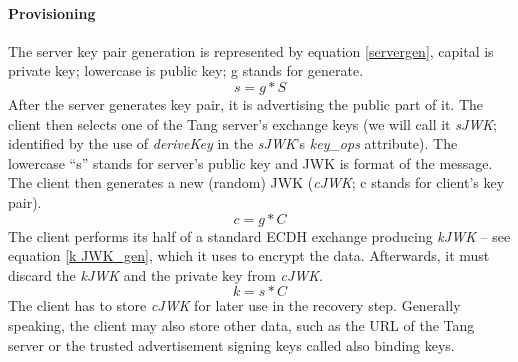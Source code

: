 \paragraph{Provisioning}
The server key pair generation is represented by equation \ref{servergen}, capital is private key; lowercase is public key; g stands for generate.
\begin{equation}\label{servergen}
    s = g * S
\end{equation}
After the server generates key pair, it is advertising the public part of it.
The client then selects one of the Tang server's exchange keys (we will call it {\it sJWK}; identified by the use of {\it deriveKey} in the {\it sJWK}'s {\it key\_ops} attribute).
The lowercase “s” stands for server's public key and JWK is format of the message.
The client then generates a new (random) JWK ({\it cJWK}; c stands for client's key pair).
\begin{equation}\label{clientgen}
    c = g * C
\end{equation}
The client performs its half of a standard ECDH exchange producing {\it kJWK} -- see equation \ref{k    JWK_gen}, which it uses to encrypt the data.
Afterwards, it must discard the {\it kJWK} and the private key from {\it cJWK}.
\begin{equation}\label{kJWK_gen}
    k = s * C
\end{equation}
The client has to store {\it cJWK} for later use in the recovery step.
Generally speaking, the client may also store other data, such as the URL of the Tang server or the trusted advertisement signing keys called also binding keys.



